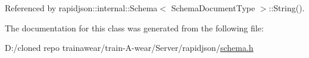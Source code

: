 Referenced by rapidjson\+::internal\+::\+Schema$<$ Schema\+Document\+Type $>$\+::\+String().



The documentation for this class was generated from the following file\+:\begin{DoxyCompactItemize}
\item 
D\+:/cloned repo trainawear/train-\/\+A-\/wear/\+Server/rapidjson/\mbox{\hyperlink{schema_8h}{schema.\+h}}\end{DoxyCompactItemize}
